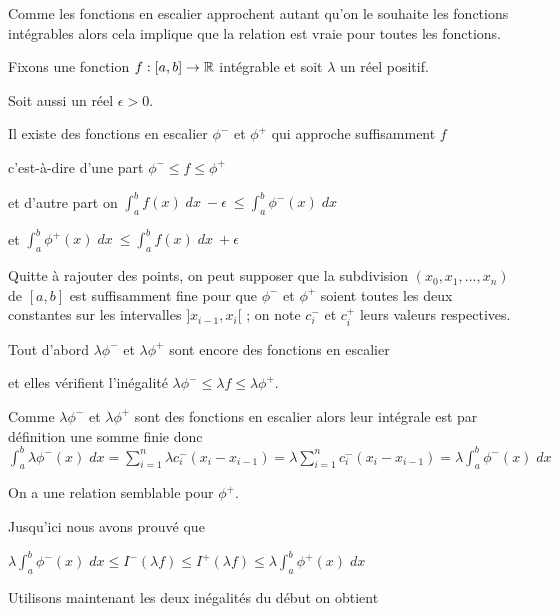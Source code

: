 Comme les fonctions en escalier 
approchent autant qu'on le souhaite les fonctions intégrables 
alors cela implique que la relation est vraie pour toutes les fonctions.




\change

Fixons une fonction $f : [a,b] \to \mathbb{R}$ intégrable et soit $\lambda$ un réel positif.

Soit aussi un réel $\epsilon >0 $. 

\change

Il existe des fonctions en escalier $\phi^-$ et $\phi^+$ qui approche suffisamment $f$

c'est-à-dire d'une part $\phi^- \le f \le \phi^+$ 

\change

et d'autre part on
$\int_a^b f(x)\; dx  \ - \epsilon\  \le \int_a^b \phi^-(x)\;dx$

\change

et $\int_a^b \phi^+(x)\;dx \  \le \int_a^b f(x)\; dx  \ + \epsilon$

\change

Quitte à rajouter des points, on peut supposer que la subdivision $(x_0,x_1,\ldots,x_n)$ de $[a,b]$ 
est suffisamment fine pour que $\phi^-$ et $\phi^+$ soient toutes les deux constantes 
sur les intervalles $]x_{i-1},x_i[$ ; on note $c_i^-$ et $c_i^+$ leurs valeurs respectives.


\change

Tout d'abord $\lambda \phi^-$ et $\lambda \phi^+$ 
sont encore des fonctions en escalier

et elles vérifient l'inégalité 
$\lambda \phi^- \le \lambda f \le \lambda\phi^+$. 

\change

Comme $\lambda \phi^-$ et $\lambda \phi^+$ sont des fonctions en escalier
alors leur intégrale est par définition une somme finie 
donc 
$\int_a^b \lambda \phi^-(x)\;dx =  \sum_{i=1}^n \lambda c_i^-(x_{i}-x_{i-1})
= \lambda \sum_{i=1}^n  c_i^-(x_{i}-x_{i-1}) = \lambda\int_a^b  \phi^-(x)\;dx$

On a une relation semblable pour $\phi^+$.

\change

Jusqu'ici nous avons prouvé que 

$\lambda\int_a^b \phi^-(x)\;dx \le I^-(\lambda f) \le I^+(\lambda f) 
\le \lambda\int_a^b \phi^+(x)\;dx$

\change

Utilisons maintenant les deux inégalités du début 
 on obtient

